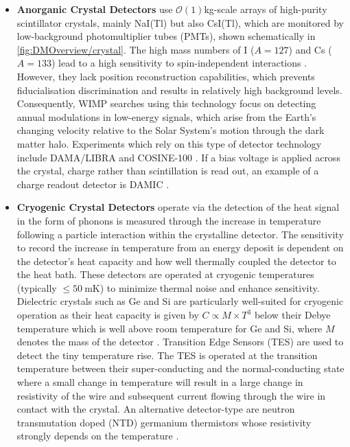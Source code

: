 \begin{itemize}
    \item \textbf{Anorganic Crystal Detectors} use $\mathcal{O}(1)$kg-scale arrays of high-purity scintillator crystals, mainly NaI(Tl) but also CsI(Tl), which are monitored by low-background photomultiplier tubes (PMTs), shown schematically in \autoref{fig:DMOverview/crystal}. The high mass numbers of I ($A=127$) and Cs ($A=133$) lead to a high sensitivity to spin-independent interactions \cite{Schumann:2019eaa}. However, they lack position reconstruction capabilities, which prevents fiducialisation discrimination and results in relatively high background levels. Consequently, WIMP searches using this technology focus on detecting annual modulations in low-energy signals, which arise from the Earth’s changing velocity relative to the Solar System's motion through the dark matter halo. Experiments which rely on this type of detector technology include DAMA/LIBRA \cite{DAMA:2008jlt} and COSINE-100 \cite{COSINE-100:2019lgn}. If a bias voltage is applied across the crystal, charge rather than scintillation is read out, an example of a charge readout detector is DAMIC \cite{Privitera:2024tpq}.
    
    \item \textbf{Cryogenic Crystal Detectors} operate via the detection of the heat signal in the form of phonons is measured through the increase in temperature following a particle interaction within the crystalline detector. The sensitivity to record the increase in temperature from an energy deposit is dependent on the detector's heat capacity and how well thermally coupled the detector to the heat bath. These detectors are operated at cryogenic temperatures (typically $\leq50~\text{mK}$) to minimize thermal noise and enhance sensitivity. Dielectric crystals such as Ge and Si are particularly well-suited for cryogenic operation as their heat capacity is given by $C \propto M \times T^3$ below their Debye temperature which is well above room temperature for Ge and Si, where $M$ denotes the mass of the detector \cite{Schumann:2019eaa}. Transition Edge Sensors (TES) are used to detect the tiny temperature rise. The TES is operated at the transition temperature between their super-conducting and the normal-conducting state where a small change in temperature will result in a large change in resistivity of the wire and subsequent current flowing through the wire in contact with the crystal. An alternative detector-type are neutron transmutation doped (NTD) germanium thermistors whose resistivity strongly depends on the temperature \cite{Schumann:2019eaa}. 
    

\end{itemize}
